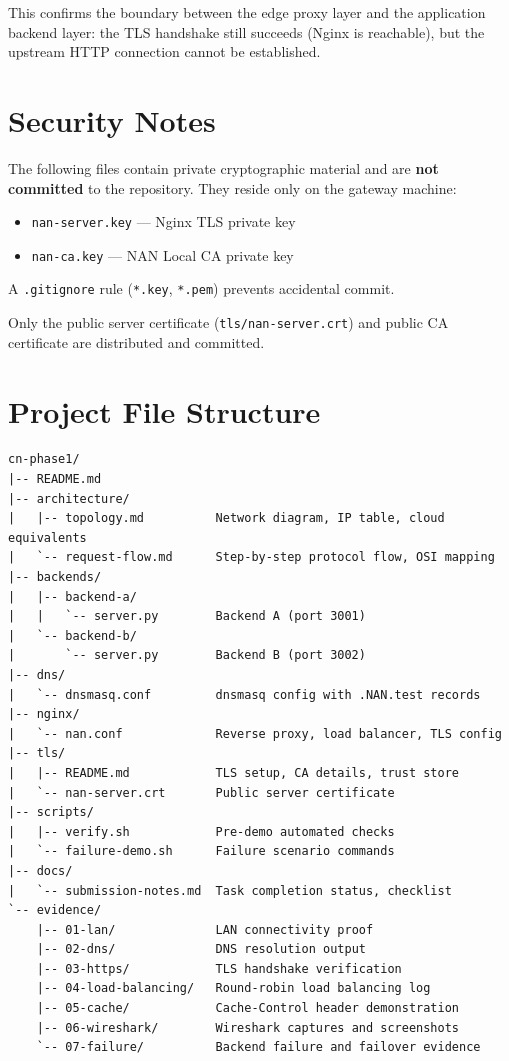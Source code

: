 \documentclass[12pt,a4paper]{article}
\begin{document}
This confirms the boundary between the edge proxy layer and the application backend layer: the TLS handshake still succeeds (Nginx is reachable), but the upstream HTTP connection cannot be established.

\section{Security Notes}

\begin{warningbox}
The following files contain private cryptographic material and are \textbf{not committed} to the repository. They reside only on the gateway machine:
\begin{itemize}
  \item \texttt{nan-server.key} --- Nginx TLS private key
  \item \texttt{nan-ca.key} --- NAN Local CA private key
\end{itemize}
A \texttt{.gitignore} rule (\texttt{*.key}, \texttt{*.pem}) prevents accidental commit.
\end{warningbox}

Only the public server certificate (\texttt{tls/nan-server.crt}) and public CA certificate are distributed and committed.

\section{Project File Structure}

\begin{lstlisting}
cn-phase1/
|-- README.md
|-- architecture/
|   |-- topology.md          Network diagram, IP table, cloud equivalents
|   `-- request-flow.md      Step-by-step protocol flow, OSI mapping
|-- backends/
|   |-- backend-a/
|   |   `-- server.py        Backend A (port 3001)
|   `-- backend-b/
|       `-- server.py        Backend B (port 3002)
|-- dns/
|   `-- dnsmasq.conf         dnsmasq config with .NAN.test records
|-- nginx/
|   `-- nan.conf             Reverse proxy, load balancer, TLS config
|-- tls/
|   |-- README.md            TLS setup, CA details, trust store
|   `-- nan-server.crt       Public server certificate
|-- scripts/
|   |-- verify.sh            Pre-demo automated checks
|   `-- failure-demo.sh      Failure scenario commands
|-- docs/
|   `-- submission-notes.md  Task completion status, checklist
`-- evidence/
    |-- 01-lan/              LAN connectivity proof
    |-- 02-dns/              DNS resolution output
    |-- 03-https/            TLS handshake verification
    |-- 04-load-balancing/   Round-robin load balancing log
    |-- 05-cache/            Cache-Control header demonstration
    |-- 06-wireshark/        Wireshark captures and screenshots
    `-- 07-failure/          Backend failure and failover evidence
\end{lstlisting}
\end{document}
